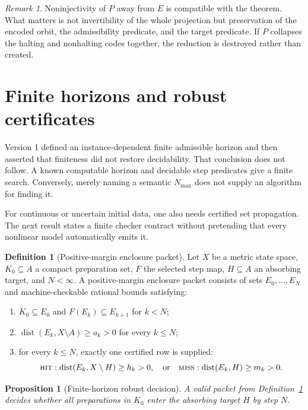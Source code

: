 \documentclass[11pt]{article}
\newtheorem{proposition}[theorem]{Proposition}
\theoremstyle{definition}
\newtheorem{definition}[theorem]{Definition}
\theoremstyle{remark}
\newtheorem{remark}[theorem]{Remark}
\newcommand{\dist}{\operatorname{dist}}
\begin{document}
\begin{remark}
Noninjectivity of \(P\) away from \(E\) is compatible with the theorem.  What
matters is not invertibility of the whole projection but preservation of the
encoded orbit, the admissibility predicate, and the target predicate.  If
\(P\) collapses the halting and nonhalting codes together, the reduction is
destroyed rather than created.
\end{remark}

\section{Finite horizons and robust certificates}

Version 1 defined an instance-dependent finite admissible horizon and then
asserted that finiteness did not restore decidability.  That conclusion does
not follow.  A known computable horizon and decidable step predicates give a
finite search.  Conversely, merely naming a semantic \(N_{\max}\) does not
supply an algorithm for finding it.

For continuous or uncertain initial data, one also needs certified set
propagation.  The next result states a finite checker contract without
pretending that every nonlinear model automatically emits it.

\begin{definition}[Positive-margin enclosure packet]\label{def:packet}
Let \(X\) be a metric state space, \(K_0\subseteq A\) a compact preparation
set, \(F\) the selected step map, \(H\subseteq A\) an absorbing target, and
\(N<\infty\).  A positive-margin enclosure packet consists of sets
\(E_0,\ldots,E_N\) and machine-checkable rational bounds satisfying:
\begin{enumerate}[label=(V\arabic*)]
\item \(K_0\subseteq E_0\) and \(F(E_k)\subseteq E_{k+1}\) for \(k<N\);
\item \(\dist(E_k,X\setminus A)\geq a_k>0\) for every \(k\leq N\);
\item for every \(k\leq N\), exactly one certified row is supplied:
\[
\textsc{hit}: \dist(E_k,X\setminus H)\geq h_k>0,
\quad\text{or}\quad
\textsc{miss}: \dist(E_k,H)\geq m_k>0.
\]
\end{enumerate}
\end{definition}

\begin{proposition}[Finite-horizon robust decision]\label{prop:finite}
A valid packet from Definition~\ref{def:packet} decides whether all
preparations in \(K_0\) enter the absorbing target \(H\) by step \(N\).
\end{proposition}
\end{document}
